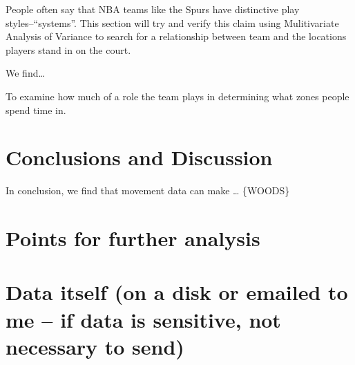 \documentclass[]{article}
\begin{document}
People often say that NBA teams like the Spurs have distinctive play
styles--``systems''. This section will try and verify this claim using
Mulitivariate Analysis of Variance to search for a relationship between
team and the locations players stand in on the court.

We find\ldots{}

To examine how much of a role the team plays in determining what zones
people spend time in.

\hypertarget{conclusions-and-discussion}{%
\section{Conclusions and Discussion}\label{conclusions-and-discussion}}

In conclusion, we find that movement data can make \ldots{} \{WOODS\}

\hypertarget{points-for-further-analysis}{%
\section{Points for further
analysis}\label{points-for-further-analysis}}

\hypertarget{data-itself-on-a-disk-or-emailed-to-me-if-data-is-sensitive-not-necessary-to-send}{%
\section{Data itself (on a disk or emailed to me -- if data is
sensitive, not necessary to
send)}\label{data-itself-on-a-disk-or-emailed-to-me-if-data-is-sensitive-not-necessary-to-send}}
\end{document}
